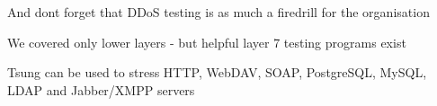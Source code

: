 \documentclass[20pt,landscape,a4paper,footrule]{foils}
\begin{document}
\vskip 2cm
\centerline{And dont forget that DDoS testing is as much a firedrill for the organisation}



\begin{list1}
\item We covered only lower layers - but helpful layer 7 testing programs exist
\item Tsung can be used to stress HTTP, WebDAV, SOAP, PostgreSQL, MySQL, LDAP and Jabber/XMPP servers 
\end{list1}

\myquestionspage
\end{document}
